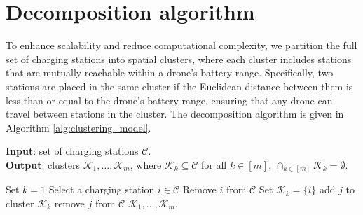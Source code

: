 \documentclass{article}
\newcommand{\set}[1]{\mathcal{#1}}
\begin{document}
\begin{table}[htbp]
\caption{Comparison of all strategies across three key performance metrics: (a) fire percentage, (b) map explored, and (c) total distance.}
\label{fig:combined_tables}
\end{table}



\section{Decomposition algorithm}
To enhance scalability and reduce computational complexity, we partition the full set of charging stations into spatial clusters, where each cluster includes stations that are mutually reachable within a drone’s battery range. Specifically, two stations are placed in the same cluster if the Euclidean distance between them is less than or equal to the drone's battery range, ensuring that any drone can travel between stations in the cluster. The decomposition algorithm is given in Algorithm \ref{alg:clustering_model}.
 \begin{algorithm}[h]
        \caption{Clustering model \label{alg:clustering_model}} 
        \textbf{Input}: set of charging stations $\set C$. \\ 
        \textbf{Output}: clusters $\set K_1, \ldots, \set K_m$, where $\set K_k \subseteq \set C$ for all $k \in [m]$, $\cap_{k \in [m]} \set K_k = \emptyset$.

      \begin{algorithmic}[1]
            \STATE Set $k = 1$ 
            \WHILE{$\set C \neq \emptyset$}
            \STATE Select a charging station $i \in \set C$
            \STATE Remove $i$ from $\set C$
            \STATE Set $\set K_k = \{i\}$
            \FOR{$j \in \set C \setminus \{i\}$}
            \STATE add $j$ to cluster $\set K_k$
            \STATE remove $j$ from $\set C$
            \ENDIF
            \ENDFOR
            \ENDWHILE
            \RETURN $\set K_1, \ldots, \set K_m$.
         \end{algorithmic}
    \end{algorithm}
\end{document}
